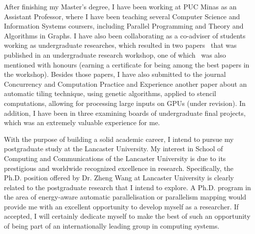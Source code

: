 \documentclass{article}
\begin{document}
After finishing my Master's degree, I have been working at PUC Minas as an
Assistant Professor, where I have been teaching several Computer Science and
Information Systems coursers, including Parallel Programming and Theory and
Algorithms in Graphs.  I have also been collaborating as a co-adviser of
students working as undergraduate researches, which resulted in two
papers~\cite{saffran2015apriori,pereira2015stencilbench} that was published in
an undergraduate research workshop, one of which~\cite{pereira2015stencilbench}
was also mentioned with honours (earning a certificate for being among the best
papers in the workshop). Besides those papers, I have also submitted to the
journal Concurrency and Computation Practice and Experience another paper about
an automatic tiling technique, using genetic algorithms, applied to stencil
computations, allowing for processing large inputs on GPUs (under revision).
In addition, I have been in three examining boards of undergraduate final
projects, which was an extremely valuable experience for me.


With the purpose of building a solid academic career, I intend to pursue my
postgraduate study at the Lancaster University.  My interest in School of
Computing and Communications of the Lancaster University is due to its
prestigious and worldwide recognized excellence in research.  Specifically, the
Ph.D. position offered by Dr. Zheng Wang at Lancaster University is clearly
related to the postgraduate research that I intend to explore.  A Ph.D. program
in the area of energy-aware automatic parallelisation or parallelism mapping would
provide me with an excellent opportunity to develop myself as a researcher.
If accepted, I will certainly dedicate myself to make the best of such an
opportunity of being part of an internationally leading group in computing
systems.

\nocite{*}


\end{document}
